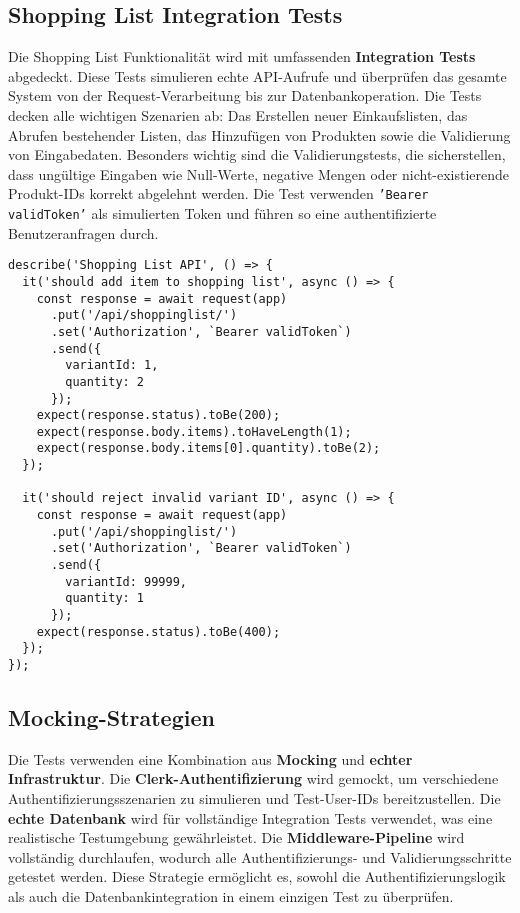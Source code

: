 \subsection{Shopping List Integration Tests}

Die Shopping List Funktionalität wird mit umfassenden \textbf{Integration Tests} abgedeckt. Diese Tests simulieren echte API-Aufrufe und überprüfen das gesamte System von der Request-Verarbeitung bis zur Datenbankoperation. Die Tests decken alle wichtigen Szenarien ab: Das Erstellen neuer Einkaufslisten, das Abrufen bestehender Listen, das Hinzufügen von Produkten sowie die Validierung von Eingabedaten. Besonders wichtig sind die Validierungstests, die sicherstellen, dass ungültige Eingaben wie Null-Werte, negative Mengen oder nicht-existierende Produkt-IDs korrekt abgelehnt werden. Die Test verwenden \texttt{'Bearer validToken'} als simulierten Token und führen so eine authentifizierte Benutzeranfragen durch.

\begin{lstlisting}[style=typescriptstyle,caption={Shopping List Integration Test}]
describe('Shopping List API', () => {
  it('should add item to shopping list', async () => {
    const response = await request(app)
      .put('/api/shoppinglist/')
      .set('Authorization', `Bearer validToken`)
      .send({
        variantId: 1,
        quantity: 2
      });
    expect(response.status).toBe(200);
    expect(response.body.items).toHaveLength(1);
    expect(response.body.items[0].quantity).toBe(2);
  });

  it('should reject invalid variant ID', async () => {
    const response = await request(app)
      .put('/api/shoppinglist/')
      .set('Authorization', `Bearer validToken`)
      .send({
        variantId: 99999,
        quantity: 1
      });
    expect(response.status).toBe(400);
  });
});
\end{lstlisting}

\subsection{Mocking-Strategien}

Die Tests verwenden eine Kombination aus \textbf{Mocking} und \textbf{echter Infrastruktur}. Die \textbf{Clerk-Authentifizierung} wird gemockt, um verschiedene Authentifizierungsszenarien zu simulieren und Test-User-IDs bereitzustellen. Die \textbf{echte Datenbank} wird für vollständige Integration Tests verwendet, was eine realistische Testumgebung gewährleistet. Die \textbf{Middleware-Pipeline} wird vollständig durchlaufen, wodurch alle Authentifizierungs- und Validierungsschritte getestet werden. Diese Strategie ermöglicht es, sowohl die Authentifizierungslogik als auch die Datenbankintegration in einem einzigen Test zu überprüfen.

